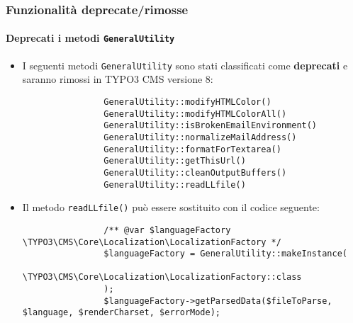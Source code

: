 \begin{frame}[fragile]
	\frametitle{Funzionalità deprecate/rimosse}
	\framesubtitle{Deprecati i metodi \texttt{GeneralUtility}}

	\lstset{basicstyle=\tiny\ttfamily}

	\begin{itemize}
		\item I seguenti metodi \texttt{GeneralUtility} sono stati classificati come \textbf{deprecati}
			e saranno rimossi in TYPO3 CMS versione 8:

			\begin{lstlisting}
				GeneralUtility::modifyHTMLColor()
				GeneralUtility::modifyHTMLColorAll()
				GeneralUtility::isBrokenEmailEnvironment()
				GeneralUtility::normalizeMailAddress()
				GeneralUtility::formatForTextarea()
				GeneralUtility::getThisUrl()
				GeneralUtility::cleanOutputBuffers()
				GeneralUtility::readLLfile()
			\end{lstlisting}

		\item Il metodo \texttt{readLLfile()} può essere sostituito con il codice seguente:

			\begin{lstlisting}
				/** @var $languageFactory \TYPO3\CMS\Core\Localization\LocalizationFactory */
				$languageFactory = GeneralUtility::makeInstance(
				  \TYPO3\CMS\Core\Localization\LocalizationFactory::class
				);
				$languageFactory->getParsedData($fileToParse, $language, $renderCharset, $errorMode);
			\end{lstlisting}

	\end{itemize}

\end{frame}


